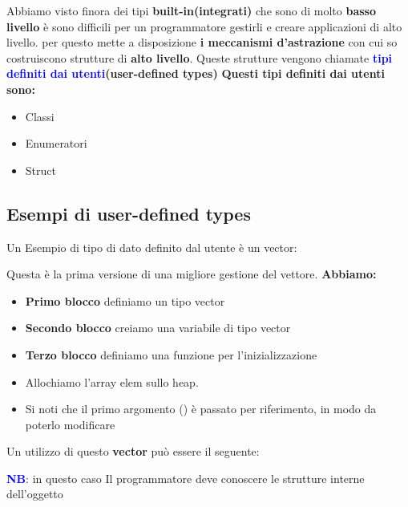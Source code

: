 Abbiamo visto finora dei tipi \textbf{built-in(integrati)} che sono di molto \textbf{basso livello} è sono difficili per un programmatore gestirli e creare applicazioni di alto livello.\newline
per questo  mette a disposizione \textbf{i meccanismi d'astrazione} con cui so costruiscono strutture di \textbf{alto livello}. Queste strutture vengono chiamate \textbf{\textcolor{blue}{tipi definiti dai utenti}(user-defined types)}\newline \newline
\textbf{Questi tipi definiti dai utenti sono:} 
\begin{itemize}
    \item Classi
    \item Enumeratori
    \item Struct
\end{itemize}

\subsection{Esempi di user-defined types}
Un Esempio di tipo di dato definito dal utente è un vector:

Questa è la prima versione di una migliore gestione del vettore. \newline\newline
\textbf{Abbiamo:}
\begin{itemize}
    \item \textbf{Primo blocco} definiamo un tipo vector
    \item \textbf{Secondo blocco} creiamo una variabile di tipo vector
    \item \textbf{Terzo blocco} definiamo una funzione per l'inizializzazione
    \item Allochiamo l’array elem sullo heap.
    \item Si noti che il primo argomento (\textcolor{blue}{}) è passato per
    riferimento, in modo da poterlo modificare
\end{itemize}
\begin{tcolorbox}[width=15cm, boxsep=10pt]
    Un utilizzo di questo \textbf{vector} può essere il seguente:
    
    \textcolor{blue}{\textbf{NB}:} in questo caso Il programmatore deve conoscere le strutture interne dell'oggetto
\end{tcolorbox}
\newpage
